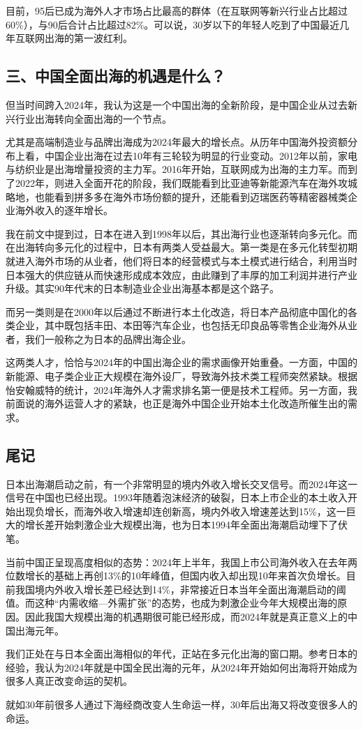 目前，95后已成为海外人才市场占比最高的群体（在互联网等新兴行业占比超过60\%），与90后合计占比超过82\%。可以说，30岁以下的年轻人吃到了中国最近几年互联网出海的第一波红利。

\subsection{三、中国全面出海的机遇是什么？}

但当时间跨入2024年，我认为这是一个中国出海的全新阶段，是中国企业从过去新兴行业出海转向全面出海的一个节点。

尤其是高端制造业与品牌出海成为2024年最大的增长点。从历年中国海外投资额分布上看，中国企业出海在过去10年有三轮较为明显的行业变动。2012年以前，家电与纺织业是出海增量投资的主力军。2016年开始，互联网成为出海的主力军。而到了2022年，则进入全面开花的阶段，我们既能看到比亚迪等新能源汽车在海外攻城略地，也能看到拼多多在海外市场份额的提升，还能看到迈瑞医药等精密器械类企业海外收入的逐年增长。

我在前文中提到过，日本在进入到1998年以后，其出海行业也逐渐转向多元化。而在出海转向多元化的过程中，日本有两类人受益最大。第一类是在多元化转型初期就进入海外市场的从业者，他们将日本的经营模式与本土模式进行结合，利用当时日本强大的供应链从而快速形成成本效应，由此赚到了丰厚的加工利润并进行产业升级。其实90年代末的日本制造业企业出海基本都是这个路子。

而另一类则是在2000年以后通过不断进行本土化改造，将日本产品彻底中国化的各类企业，其中既包括丰田、本田等汽车企业，也包括无印良品等零售企业海外从业者，我们一般称之为日本的品牌出海企业。

这两类人才，恰恰与2024年的中国出海企业的需求画像开始重叠。一方面，中国的新能源、电子类企业正大规模在海外设厂，导致海外技术类工程师突然紧缺。根据怡安翰威特的统计，2024年海外人才需求排名第一便是技术工程师。另一方面，我前面说的海外运营人才的紧缺，也正是海外中国企业开始本土化改造所催生出的需求。

\subsection{尾记}

日本出海潮启动之前，有一个非常明显的境内外收入增长交叉信号。而2024年这一信号在中国也已经出现。1993年随着泡沫经济的破裂，日本上市企业的本土收入开始出现负增长，而海外收入增速却连创新高，境内外收入增速差达到15\%，这一巨大的增长差开始刺激企业大规模出海，也为日本1994年全面出海潮启动埋下了伏笔。

当前中国正呈现高度相似的态势：2024年上半年，我国上市公司海外收入在去年两位数增长的基础上再创13\%的10年峰值，但国内收入却出现10年来首次负增长。目前我国境内外收入增长差已经达到14\%，非常接近日本当年全面出海潮启动的阈值。而这种“内需收缩—外需扩张”的态势，也成为刺激企业今年大规模出海的原因。因此我国大规模出海的机遇期很可能已经形成，而2024年就是真正意义上的中国出海元年。

我们正处在与日本全面出海相似的年代，正站在多元化出海的窗口期。参考日本的经验，我认为2024年就是中国全民出海的元年，从2024年开始如何出海将开始成为很多人真正改变命运的契机。

就如30年前很多人通过下海经商改变人生命运一样，30年后出海又将改变很多人的命运。
